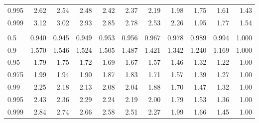 \documentclass[]{article}
\begin{document}
\begin{table}[H]
\begin{tabular}{lrrrrrrrrrr}
\hspace{1em}0.995 & 2.62 & 2.54 & 2.48 & 2.42 & 2.37 & 2.19 & 1.98 & 1.75 & 1.61 & 1.43\\
\hspace{1em}0.999 & 3.12 & 3.02 & 2.93 & 2.85 & 2.78 & 2.53 & 2.26 & 1.95 & 1.77 & 1.54\\
\addlinespace[0.3em]
\multicolumn{11}{l}{$k_2=\infty$}\\
\hspace{1em}0.5 & 0.940 & 0.945 & 0.949 & 0.953 & 0.956 & 0.967 & 0.978 & 0.989 & 0.994 & 1.000\\
\hspace{1em}0.9 & 1.570 & 1.546 & 1.524 & 1.505 & 1.487 & 1.421 & 1.342 & 1.240 & 1.169 & 1.000\\
\hspace{1em}0.95 & 1.79 & 1.75 & 1.72 & 1.69 & 1.67 & 1.57 & 1.46 & 1.32 & 1.22 & 1.00\\
\hspace{1em}0.975 & 1.99 & 1.94 & 1.90 & 1.87 & 1.83 & 1.71 & 1.57 & 1.39 & 1.27 & 1.00\\
\hspace{1em}0.99 & 2.25 & 2.18 & 2.13 & 2.08 & 2.04 & 1.88 & 1.70 & 1.47 & 1.32 & 1.00\\
\hspace{1em}0.995 & 2.43 & 2.36 & 2.29 & 2.24 & 2.19 & 2.00 & 1.79 & 1.53 & 1.36 & 1.00\\
\hspace{1em}0.999 & 2.84 & 2.74 & 2.66 & 2.58 & 2.51 & 2.27 & 1.99 & 1.66 & 1.45 & 1.00\\
\bottomrule
\end{tabular}
\end{table}
\end{document}
